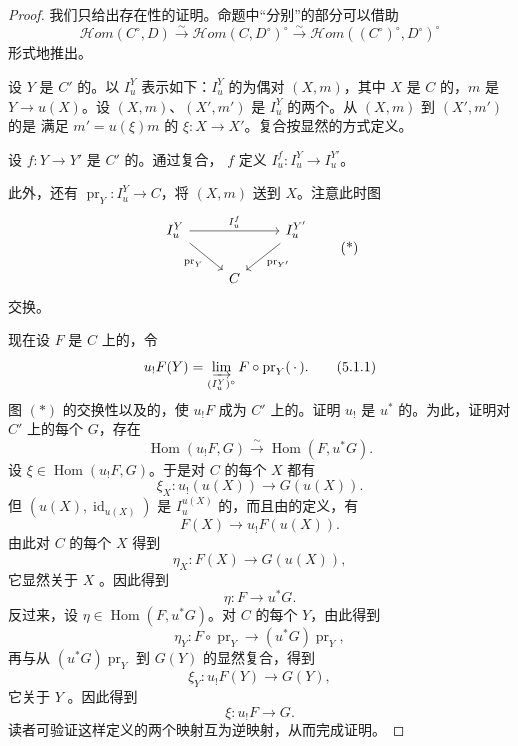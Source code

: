 \begin{proof}
我们只给出存在性的证明。命题中“分别”的部分可以借助
\[\mathcal H om(C^\circ,D)\xrightarrow{\sim}\mathcal H om(C,D^\circ)^\circ\xrightarrow{\sim}\mathcal H om((C^\circ)^\circ,D^\circ)^\circ\]
形式地推出。

设 $Y$ 是 $C'$ 的。以 $I_u^Y$ 表示如下：$I_u^Y$ 的为偶对 $(X,m)$，其中 $X$ 是 $C$ 的，$m$ 是 $Y\to u(X)$。设 $(X,m)$、$(X',m')$ 是 $I_u^Y$ 的两个。从 $(X,m)$ 到 $(X',m')$ 的是
满足 $m'=u(\xi)m$ 的 $\xi:X\to X'$。复合按显然的方式定义。

设 $f:Y\to Y'$ 是 $C'$ 的。通过复合， $f$ 定义 $I_u^f:I_u^Y\to I_u^{Y'}$。

此外，还有 $\operatorname{pr}_Y:I_u^Y\to C$，将 $(X,m)$ 送到 $X$。注意此时图
\[\begin{tikzcd}I_u^Y\arrow[rr,"I_u^f"]\arrow[dr,"\operatorname{pr}_Y"']&&I_u^{Y'}\arrow[dl,"\operatorname{pr}_{Y'}"]\\&C&\end{tikzcd}\tag{*}\]
交换。

现在设 $F$ 是 $C$ 上的，令
\[u_!F(Y)=\varinjlim_{(I_u^Y)^\circ}F\circ\operatorname{pr}_Y(\,\cdot\,).\tag{5.1.1}\]
图 $(*)$ 的交换性以及的，使 $u_!F$ 成为 $C'$ 上的。证明 $u_!$ 是 $u^*$ 的。为此，证明对 $C'$ 上的每个 $G$，存在
\[\operatorname{Hom}(u_!F,G)\xrightarrow{\sim}\operatorname{Hom}(F,u^*G).\]
设 $\xi\in\operatorname{Hom}(u_!F,G)$。于是对 $C$ 的每个 $X$ 都有
\[\xi_X:u_!(u(X))\longrightarrow G(u(X)).\]
但 $(u(X),\operatorname{id}_{u(X)})$ 是 $I_u^{u(X)}$ 的，而且由的定义，有
\[F(X)\longrightarrow u_!F(u(X)).\]
由此对 $C$ 的每个 $X$ 得到
\[\eta_X:F(X)\longrightarrow G(u(X)),\]
它显然关于 $X$ 。因此得到
\[\eta:F\longrightarrow u^*G.\]
反过来，设 $\eta\in\operatorname{Hom}(F,u^*G)$。对 $C$ 的每个 $Y$，由此得到
\[\eta_Y:F\circ\operatorname{pr}_Y\longrightarrow(u^*G)\operatorname{pr}_Y,\]
再与从 $(u^*G)\operatorname{pr}_Y$ 到 $G(Y)$ 的显然复合，得到
\[\xi_Y:u_!F(Y)\longrightarrow G(Y),\]
它关于 $Y$ 。因此得到
\[\xi:u_!F\longrightarrow G.\]
读者可验证这样定义的两个映射互为逆映射，从而完成证明。
\end{proof}
